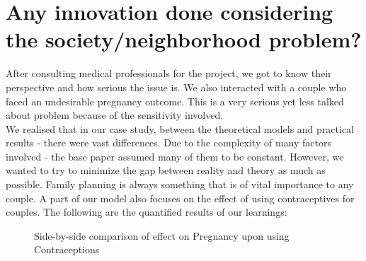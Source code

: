 \documentclass{article}
\begin{document}
\section{Any innovation done considering the society/neighborhood problem?}
After consulting medical professionals for the project, we got to know their perspective and how serious the issue is. We also interacted with a couple who faced an undesirable pregnancy outcome. This is a very serious yet less talked about problem because of the sensitivity involved. \\
We realised that in our case study, between the theoretical models and practical results - there were vast differences. Due to the complexity of many factors involved - the base paper assumed many of them to be constant. However, we wanted to try to minimize the gap between reality and theory as much as possible.\newline
Family planning is always something that is of vital importance to any couple. A part of our model also focuses on the effect of using contraceptives for couples. The following are the quantified results of our learnings: \\ 
\begin{figure}[H]%
	\centering
	\qquad
	\caption{Side-by-side comparison of effect on Pregnancy upon using Contraceptions}%
	\label{fig:example}%
\end{figure}
\end{document}
